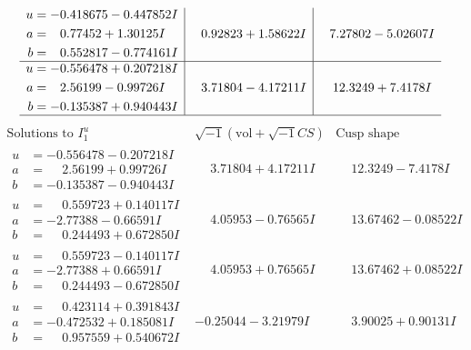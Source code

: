 \documentclass[1p]{elsarticle_modified}
\theoremstyle{definition}
\newcommand{\I}{\sqrt{-1}}
\begin{document}
$$\begin{array}{c|c|c}
\begin{aligned}
u &= -0.418675 - 0.447852 I \\
a &= \phantom{-}0.77452 + 1.30125 I \\
b &= \phantom{-}0.552817 - 0.774161 I\end{aligned}
 & \phantom{-}0.92823 + 1.58622 I & \phantom{-}7.27802 - 5.02607 I \\ \hline\begin{aligned}
u &= -0.556478 + 0.207218 I \\
a &= \phantom{-}2.56199 - 0.99726 I \\
b &= -0.135387 + 0.940443 I\end{aligned}
 & \phantom{-}3.71804 - 4.17211 I & \phantom{-}12.3249 + 7.4178 I\\
 \hline 
 \end{array}$$\newpage$$\begin{array}{c|c|c}  
\text{Solutions to }I^u_{1}& \I (\text{vol} + \sqrt{-1}CS) & \text{Cusp shape}\\
 \hline 
\begin{aligned}
u &= -0.556478 - 0.207218 I \\
a &= \phantom{-}2.56199 + 0.99726 I \\
b &= -0.135387 - 0.940443 I\end{aligned}
 & \phantom{-}3.71804 + 4.17211 I & \phantom{-}12.3249 - 7.4178 I \\ \hline\begin{aligned}
u &= \phantom{-}0.559723 + 0.140117 I \\
a &= -2.77388 - 0.66591 I \\
b &= \phantom{-}0.244493 + 0.672850 I\end{aligned}
 & \phantom{-}4.05953 - 0.76565 I & \phantom{-}13.67462 - 0.08522 I \\ \hline\begin{aligned}
u &= \phantom{-}0.559723 - 0.140117 I \\
a &= -2.77388 + 0.66591 I \\
b &= \phantom{-}0.244493 - 0.672850 I\end{aligned}
 & \phantom{-}4.05953 + 0.76565 I & \phantom{-}13.67462 + 0.08522 I \\ \hline\begin{aligned}
u &= \phantom{-}0.423114 + 0.391843 I \\
a &= -0.472532 + 0.185081 I \\
b &= \phantom{-}0.957559 + 0.540672 I\end{aligned}
 & -0.25044 - 3.21979 I & \phantom{-}3.90025 + 0.90131 I \\ \hline\begin{aligned}

\end{aligned}
\end{array}$$
\end{document}
